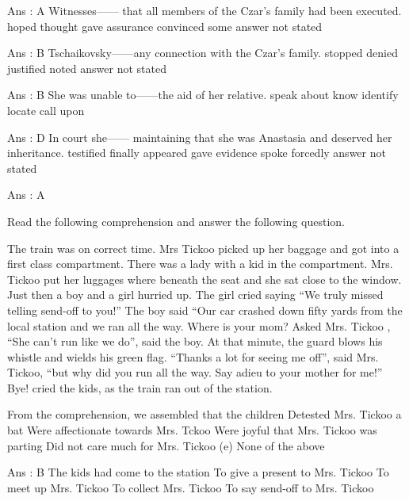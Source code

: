         Ans : A
        Witnesses------ that all members of the Czar's family had been executed.
            hoped
            thought
            gave assurance
            convinced some
            answer not stated 

        Ans : B
        Tschaikovsky------any connection with the Czar's family.
            stopped
            denied
            justified
            noted
            answer not stated 

        Ans : B
        She was unable to------the aid of her relative.
            speak about
            know
            identify
            locate
            call upon 

        Ans : D
        In court she------ maintaining that she was Anastasia and deserved her inheritance.
            testified
            finally appeared
            gave evidence
            spoke forcedly
            answer not stated 

        Ans : A 




Read the following comprehension and answer the following question.

    The train was on correct time. Mrs Tickoo picked up her baggage and got into a first class compartment. There was a lady with a kid in the compartment. Mrs. Tickoo put her luggages where beneath the seat and she sat close to the window. Just then a boy and a girl hurried up. The girl cried saying “We truly missed telling send-off to you!” The boy said “Our car crashed down fifty yards from the local station and we ran all the way. Where is your mom? Asked Mrs. Tickoo , “She can’t run like we do”, said the boy. At that minute, the guard blows his whistle and wields his green flag. “Thanks a lot for seeing me off”, said Mrs. Tickoo, “but why did you run all the way. Say adieu to your mother for me!” Bye! cried the kids, as the train ran out of the station.



        From the comprehension, we assembled that the children
            Detested Mrs. Tickoo a bat
            Were affectionate towards Mrs. Tckoo
            Were joyful that Mrs. Tickoo was parting
            Did not care much for Mrs. Tickoo (e) None of the above

        Ans : B
        The kids had come to the station
            To give a present to Mrs. Tickoo
            To meet up Mrs. Tickoo
            To collect Mrs. Tickoo
            To say send-off to Mrs. Tickoo 

